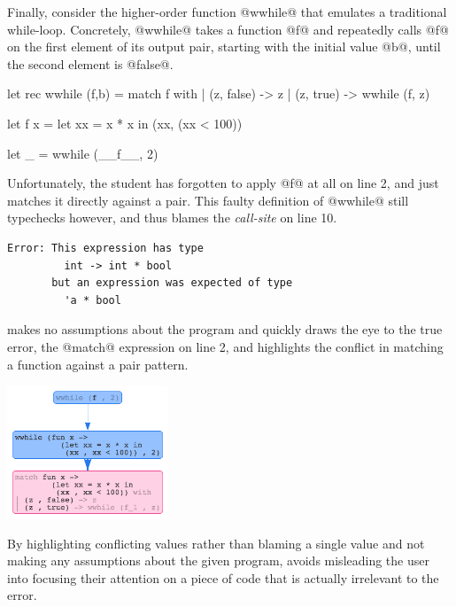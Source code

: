 Finally, consider the higher-order function @wwhile@ that emulates a
traditional while-loop. Concretely, @wwhile@ takes a function @f@ and
repeatedly calls @f@ on the first element of its output pair, starting
with the initial value @b@, until the second element is @false@.
%
\begin{ecode}
let rec wwhile (f,b) =
  match f with
  | (z, false) -> z
  | (z, true)  -> wwhile (f, z)

let f x =
  let xx = x * x in
  (xx, (xx < 100))

let _ = wwhile (__f__, 2)
\end{ecode}
%
Unfortunately, the student has forgotten to apply @f@ at all on line 2,
and just matches it directly against a pair. This faulty definition of
@wwhile@ still typechecks however, and \ocaml thus blames the
\emph{call-site} on line 10.
%
\begin{verbatim}
Error: This expression has type
         int -> int * bool
       but an expression was expected of type
         'a * bool
\end{verbatim}
%
\toolname makes no assumptions about the program and quickly draws the
eye to the true error, the @match@ expression on line 2, and highlights
the conflict in matching a function against a pair pattern.
%
\begin{center}
  \includegraphics[height=150px]{wwhile.png}
\end{center}
%

By highlighting conflicting values rather than blaming a single value
and not making any assumptions about the given program, \toolname avoids
misleading the user into focusing their attention on a piece of code
that is actually irrelevant to the error.











